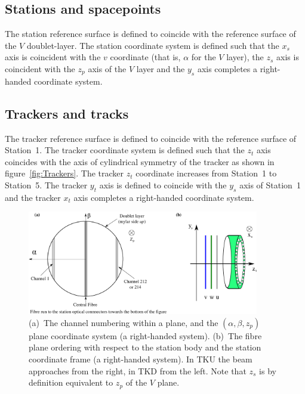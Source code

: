   \subsection{Stations and spacepoints}
  The station reference surface is defined to coincide with the reference surface of the $V$ doublet-layer. The station coordinate system is defined such that the $x_s$ axis is coincident with the $v$ coordinate (that is, $\alpha$ for the $V$ layer), the $z_s$ axis is coincident with the $z_p$ axis of the $V$ layer and the $y_s$ axis completes a right-handed coordinate system.

  \subsection{Trackers and tracks}
  The tracker reference surface is defined to coincide with the reference surface of Station~1. The tracker coordinate system is defined such that the $z_t$ axis coincides with the axis of cylindrical symmetry of the tracker as shown in figure~\ref{fig:Trackers}. The tracker $z_t$ coordinate increases from Station~1 to Station~5. The tracker $y_t$ axis is defined to coincide with the $y_s$ axis of Station~1 and the tracker $x_t$ axis completes a right-handed coordinate system. 
  
  \begin{figure}[htb]
    \begin{center}
      \includegraphics[width=0.9\textwidth]{02-CoordinateSystems/PlaneCoordinatesAndNumbering.pdf}
      \caption{\label{fig:DoubletLayerOrder} (a)~The channel numbering within a plane, and the $(\alpha, \beta, z_p)$ plane coordinate system (a right-handed system).  (b)~The fibre plane ordering with respect to the station body and the station coordinate frame (a right-handed system).  In TKU the beam approaches from the right, in TKD from the left. Note that $z_s$ is by definition equivalent to $z_p$ of the $V$ plane.}
    \end{center}
  \end{figure}

